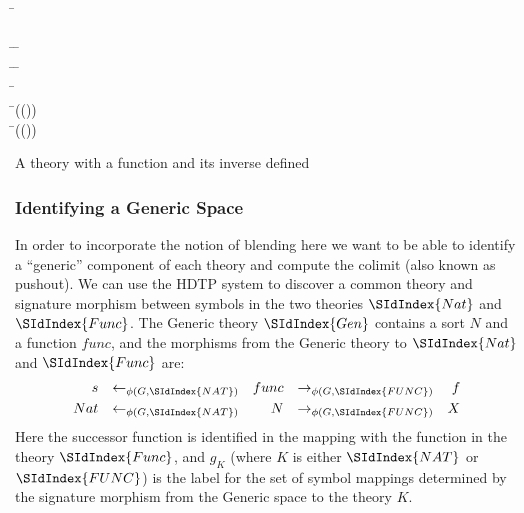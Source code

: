 \begin{listing}[!ht]
\begin{mdframed}
\begin{hetcasl}
\SPEC \= \Ax{=}\\
\> \SORT {}\\
\> \OP \= \Ax{:} \= \Ax{\rightarrow} \\
\> \OP \= \Ax{:} \= \Ax{\rightarrow} \\
\> \Ax{\forall} \= \Ax{:}  \\
\> \Ax{\bullet} \=(()) \Ax{=} \\
\> \Ax{\bullet} \=(()) \Ax{=} \\
\end{hetcasl}
\end{mdframed}
\caption{A theory with a function and its inverse defined}
\label{fig:inv}
\end{listing}



\subsubsection{Identifying a Generic Space}
In order to incorporate the notion of blending here we want to be able
to identify a ``generic'' component of each theory and compute the
colimit (also known as pushout).
We can use the
HDTP system \parencite{GustKS2006,Schmidt2010} to discover a common theory
and signature morphism between symbols in the
two theories $\SIdIndex{Nat}$ and $\SIdIndex{Func}$. The Generic theory
$\SIdIndex{Gen}$
contains a sort $N$ and a function $func$, and the morphisms from the
Generic theory to $\SIdIndex{Nat}$ and $\SIdIndex{Func}$ are:
\begin{align}
s&&\leftarrow_{\phi(G,\SIdIndex{NAT})}&&func&&\rightarrow_{\phi(G,\SIdIndex{FUNC})}&&f\\
Nat&&\leftarrow_{\phi(G,\SIdIndex{NAT})}&&N&&\rightarrow_{\phi(G,\SIdIndex{FUNC})}&&X
\end{align}
Here the successor function is identified in the mapping with the
function in the theory $\SIdIndex{Func}$, and $g_K$ (where $K$ is either
$\SIdIndex{NAT}$ or $\SIdIndex{FUNC}$) is the label for
the set of symbol mappings determined by the signature morphism from
the Generic space to the theory $K$.

